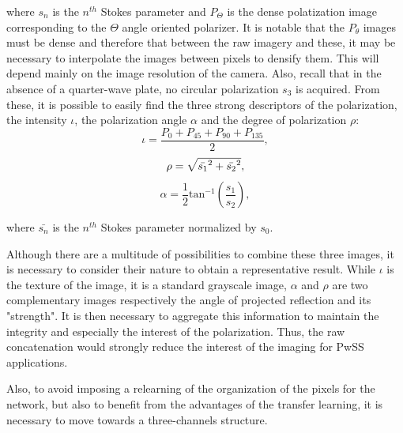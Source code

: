 where $s_n$ is the $n^{th}$ Stokes parameter and $P_\Theta$ is the dense polatization image corresponding to the $\Theta$ angle oriented polarizer.
It is notable that the $P_\theta$ images must be dense and therefore that between the raw imagery and these, it may be necessary to interpolate the images between pixels to densify them. This will depend mainly on the image resolution of the camera.
Also, recall that in the absence of a quarter-wave plate, no circular polarization $s_3$ is acquired.
From these, it is possible to easily find the three strong descriptors of the polarization, the intensity $\iota$, the polarization angle $\alpha$ and the degree of polarization $\rho$:
\begin{equation}
\iota = \frac{P_0 + P_{45} + P_{90} + P_{135}}{2},
\end{equation}
\begin{equation}
\rho = \sqrt{\Bar{s_1}^2 + \Bar{s_2}^2},
\end{equation}
\begin{equation}
\alpha = \frac{1}{2}\textrm{tan}^{-1}(\frac{s_1}{s_2}),
\end{equation}

where $\bar{s_n}$ is the $n^{th}$ Stokes parameter normalized by $s_0$.

Although there are a multitude of possibilities to combine these three images, it is necessary to consider their nature to obtain a representative result.
While $\iota$ is the texture of the image, it is a standard grayscale image, $\alpha$ and $\rho$ are two complementary images respectively the angle of projected reflection and its "strength". It is then necessary to aggregate this information to maintain the integrity and especially the interest of the polarization. Thus, the raw concatenation would strongly reduce the interest of the imaging for PwSS applications.

Also, to avoid imposing a relearning of the organization of the pixels for the network, but also to benefit from the advantages of the transfer learning, it is necessary to move towards a three-channels structure.

